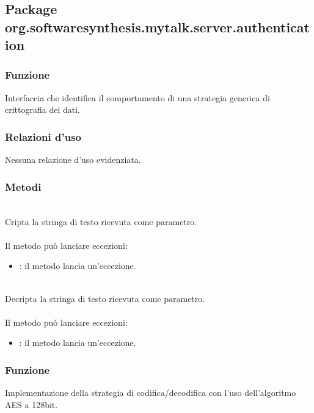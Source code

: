 \subsection{Package org.softwaresynthesis.mytalk.server.authentication}\label{sec:authentication}


\subsubsection*{Funzione}
Interfaccia che identifica il comportamento di una strategia generica di crittografia dei dati.

\subsubsection*{Relazioni d'uso}
Nessuna relazione d'uso evidenziata.

\subsubsection*{Metodi}
\begin{description}
	\item{}\\
	Cripta la stringa di testo ricevuta come parametro.\\\\
	Il metodo può lanciare eccezioni:
	\begin{itemize}
		\item {}: il metodo lancia un'eccezione.
	\end{itemize}
	\item{}\\
	Decripta la stringa di testo ricevuta come parametro.\\\\
	Il metodo può lanciare eccezioni:
	\begin{itemize}
		\item {}: il metodo lancia un'eccezione.
	\end{itemize}
\end{description}


\subsubsection*{Funzione}
Implementazione della strategia di codifica/decodifica con l'uso dell'algoritmo AES a 128bit.

